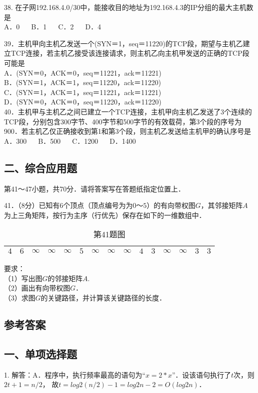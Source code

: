 38. 在子网192.168.4.0/30中，能接收目的地址为192.168.4.3的IP分组的最大主机数是 \\
A．0 $\quad$ B．1 $\quad$ C．2 $\quad$ D．4

39．主机甲向主机乙发送一个(SYN＝1，seq＝11220)的TCP段，期望与主机乙建立TCP连接，若主机乙接受该连接请求，则主机乙向主机甲发送的正确的TCP段可能是 \\
A．(SYN＝0，ACK＝0，seq＝11221，ack＝11221) \\
B．(SYN＝1，ACK＝1，seq＝11220，ack＝11220) \\
C．(SYN＝1，ACK＝1，seq＝11221，ack＝11221) \\
D．(SYN＝0，ACK＝0，seq＝11220，ack＝11220) \\

40．主机甲与主机乙之间已建立一个TCP连接，主机甲向主机乙发送了3个连续的TCP段，分别包含300字节、400字节和500字节的有效载荷，第3个段的序号为900．若主机乙仅正确接收到第1和第3个段，则主机乙发送给主机甲的确认序号是 \\
A．300 $\quad$ B．500 $\quad$ C．1200 $\quad$ D．1400




\subsection{二、综合应用题}
第41～47小题，共70分．请将答案写在答题纸指定位置上．

41．（8分）已知有$6$个顶点（顶点编号为为$0$～$5$）的有向带权图$G$，其邻接矩阵$A$为上三角矩阵，按行为主序（行优先）保存在如下的一维数组中．
\begin{table}[ht]
\centering
\caption{第41题图}\label{Na11_tab1}
\begin{tabular}{|c|c|c|c|c|c|c|c|c|c|c|c|c|c|c|}
\hline
$4$ & $6$ & $\infty$ & $\infty$ & $\infty$ & $5$ & $\infty$ & $\infty$ & $\infty$ & $4$ & $3$ & $\infty$ & $\infty$ & $3$ & $3$ \\
\hline
\end{tabular}
\end{table}
要求：  \\
（1）写出图$G$的邻接矩阵$A$.  \\
（2）画出有向带权图$G$．  \\
（3）求图$G$的关键路径，并计算该关键路径的长度．




\subsection{参考答案}
\subsection{一、单项选择题}
1. 解答：A．程序中，执行频率最高的语句为“$x=2*x$”．设该语句执行了$t$次，则$2t+1=n/2$， 故$t=log2(n/2)-1=log2n-2= O(log2n)$．

